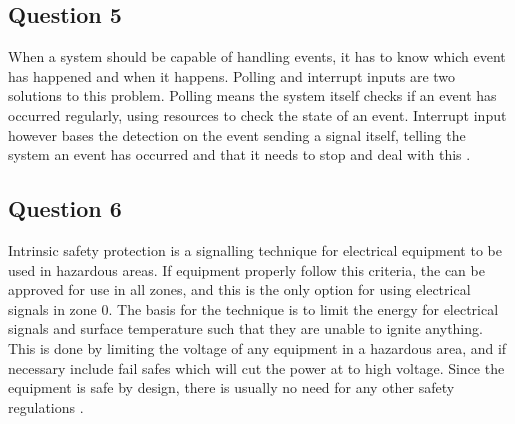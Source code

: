 \documentclass[12pt, A4paper, english]{book}
\begin{document}
			\subsection{Question 5}
When a system should be capable of handling events, it has to know which event has happened and when it happens. Polling and interrupt inputs are two solutions to this problem. Polling means the system itself checks if an event has occurred regularly, using resources to check the state of an event. Interrupt input however bases the detection on the event sending a signal itself, telling the system an event has occurred and that it needs to stop and deal with this \cite{LN}.
		
			\subsection{Question 6}
Intrinsic safety protection is a signalling technique for electrical equipment to be used in hazardous areas. If equipment properly follow this criteria, the can be approved for use in all zones, and this is the only option for using electrical signals in zone 0. The basis for the technique is to limit the energy for electrical signals and surface temperature such that they are unable to ignite anything. This is done by limiting the voltage of any equipment in a hazardous area, and if necessary include fail safes which will cut the power at to high voltage. Since the equipment is safe by design, there is usually no need for any other safety regulations \cite{LN}.
\end{document}
